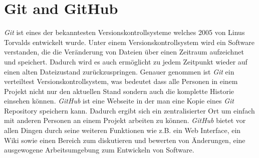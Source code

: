\section{Git and GitHub}
\textit{Git} ist eines der bekanntesten Versionskontrollsysteme welches 2005 von Linus Torvalds entwickelt wurde. Unter einem Versionskontrollsystem wird ein Software verstanden, die die Veränderung von Dateien über einen Zeitraum aufzeichnet und speichert. Dadurch wird es auch ermöglicht zu jedem Zeitpunkt wieder auf einen alten Dateizustand zurückzuspringen.
Genauer genommen ist \textit{Git} ein verteiltest Versionskontrollsystem, was bedeutet dass alle Personen in einem  Projekt nicht nur den aktuellen Stand sondern auch die komplette Historie einsehen können. \cite{preissel_stachmann_2017}
\newline
\newline
\textit{GitHub} ist eine Webseite in der man eine Kopie eines \textit{Git} Repository speichern kann. Dadurch ergibt sich ein zentralisierter Ort um einfach mit anderen Personen an einem Projekt  arbeiten zu können. \textit{GitHub} bietet vor allen Dingen durch seine weiteren Funktionen wie z.B. ein Web Interface, ein Wiki sowie einen Bereich zum diskutieren und bewerten von Änderungen, eine ausgewogene Arbeitsumgebung zum Entwickeln von Software. \cite{bell_2014}